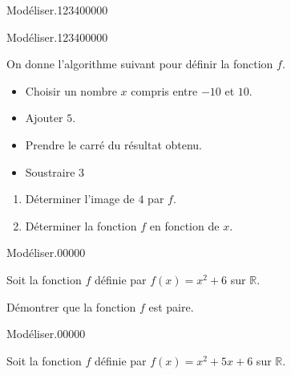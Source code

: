 \begin{pageAD}
\begin{ExoCad}{Modéliser.}{1234}{0}{0}{0}{0}{0}
\end{ExoCad}



\begin{ExoCad}{Modéliser.}{1234}{0}{0}{0}{0}{0}

On donne l'algorithme suivant pour définir la fonction $f$.

\begin{minipage}{0.48\linewidth}

\begin{itemize}
\item Choisir un nombre $x$ compris entre $-10$ et $10$.
\item Ajouter $5$. 
\item Prendre le carré du résultat obtenu.
\item Soustraire $3$
\end{itemize}

\end{minipage}
\hfill
\begin{minipage}{0.48\linewidth}

\begin{enumerate}
\item Déterminer l'image de $4$ par $f$.  
\item Déterminer la fonction $f$ en fonction de $x$.  
\end{enumerate}
\end{minipage}

\end{ExoCad}
 
 
\begin{minipage}{0.48 \linewidth}

\begin{ExoCadN}{Modéliser.}{0}{0}{0}{0}{0}

Soit la fonction $f$ définie par $f(x)=x^2+6$ sur $\mathbb R$.  

Démontrer que la fonction $f$ est paire.


\end{ExoCadN}
 
\end{minipage}
\hfill
\begin{minipage}{0.48 \linewidth}

 
\begin{ExoCadN}{Modéliser.}{0}{0}{0}{0}{0}

Soit la fonction $f$ définie par $f(x)=x^2+5x+6$ sur $\mathbb R$.  


\end{ExoCadN}
\end{minipage}
\end{pageAD}
